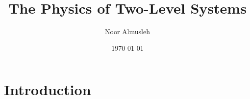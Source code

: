 \documentclass{article}
\title{The Physics of Two-Level Systems}
\author{Noor Almusleh}
\date{\today}
\begin{document}
\maketitle

\section{Introduction}
\end{document}
